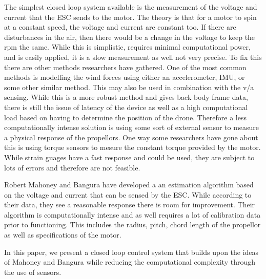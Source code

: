 \documentclass[twocolumn]{article}
\begin{document}
	The simplest closed loop system available is the measurement of the voltage and current that the ESC sends to the motor. The theory is that for a motor to spin at a constant speed, the voltage and current are constant too. If there are disturbances in the air, then there would be a change in the voltage to keep the rpm the same. While this is simplistic, requires minimal computational power, and is easily applied,  it is a slow measurement as well not very precise. To fix this there are other methods researchers have gathered. One of the most common methods is modelling the wind forces using either an accelerometer, IMU, or some other similar method. This may also be used in combination with the v/a sensing. While this is a more robust method and gives back body frame data, there is still the issue of latency of the device as well as a high computational load based on having to determine the position of the drone. Therefore a less computationally intense solution is using some sort of external sensor to measure a physical response of the propellors. One way some researchers have gone about this is using torque sensors to mesure the constant torque provided by the motor. While strain guages have a fast response and could be used, they are subject to lots of errors and therefore are not feasible. 
	
	Robert Mahoney and Bangura have developed a an estimation algorithm based on the voltage and current that can be sensed by the ESC. While according to their data, they see a reasonable response there is room for improvement. Their algorithm is computationally intense and as well requires a lot of calibration data prior to functioning. This includes the radius, pitch, chord length of the propellor as well as specifications of the motor. 
	
	In this paper, we present a closed loop control system that builds upon the ideas of Mahoney and Bangura while reducing the computational complexity through the use of sensors. 
	
\end{document}
